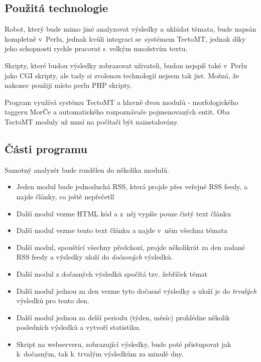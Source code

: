 \documentclass[12pt]{amsart}
\begin{document}
\subsection{Použitá technologie} 
Robot, který bude mimo jiné analyzovat vý\-sled\-ky a ukládat témata, bude napsán kompletně v~Perlu, jednak kvůli in\-te\-gra\-ci se~systémem TectoMT, jednak díky jeho schopnosti rychle pracovat s~vel\-kým množ\-stvím textu.

Skripty, které budou výsledky zobrazovat uživateli, budou nejspíš také v~Perlu jako CGI skripty, ale tady si zvolenou technologií nejsem tak jist. Možná, že nakonec použiji místo perlu PHP skripty.

Program využívá systému TectoMT a hlavně dvou modulů - morfologického taggeru MorČe a automatického rozpoznávače pojmenovaných entit. Oba TectoMT moduly už musí na počítači být nainstalovány.

\subsection{Části programu}
Samotný analyzér bude rozdělen do několika modulů.
\begin{itemize}
    \item Jeden modul bude jednoduchá  RSS, která projde přes veřejné RSS feedy, a najde články, co ještě nepřečetll
    \item Další modul vezme HTML kód a z~něj vypíše pouze čistý text článku
    \item Další modul vezme tento text článku a najde v~něm všechna témata
    \item Další modul, spouštící všechny předchozí, projde několikrát za den zadané RSS feedy a výsledky uloží do \emph{dočasných} výsledků.
    \item Další modul z dočasných výsledků spočítá tzv. žebříček témat
    \item Další modul jednou za den vezme tyto dočasné výsledky a uloží je do \emph{trvalých} výsledků pro tento den.
    \item Další modul jednou za delší periodu (týden, měsíc) prohlédne několik posledních výsledků a vytvoří statistiku.
    \item Skript na webserveru, zobrazující výsledky, bude poté přistupovat jak k~do\-čas\-ným, tak k~trvalým výsledkům za minulé dny.
\end{itemize}
\end{document}
